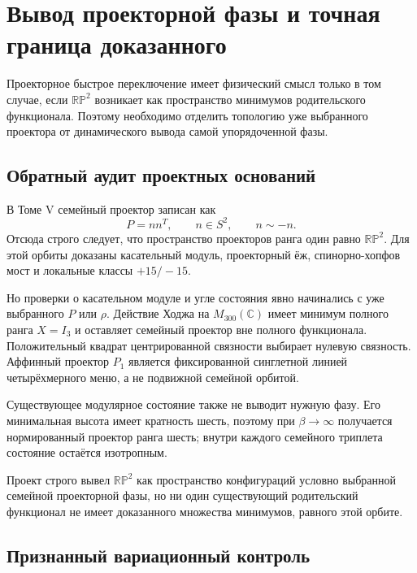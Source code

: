 \chapter{Вывод проекторной фазы и точная граница доказанного}

Проекторное быстрое переключение имеет физический смысл только в том случае, если
$\mathbb{RP}^2$ возникает как пространство минимумов родительского
функционала. Поэтому необходимо отделить топологию уже выбранного
проектора от динамического вывода самой упорядоченной фазы.

\section{Обратный аудит проектных оснований}

В Томе V семейный проектор записан как
\begin{equation}
 P=nn^T,\qquad n\in S^2,\qquad n\sim-n.
 \label{eq:v6-rp2-orbit}
\end{equation}
Отсюда строго следует, что пространство проекторов ранга один равно
$\mathbb{RP}^2$. Для этой орбиты доказаны касательный модуль, проекторный
ёж, спинорно-хопфов мост и локальные классы $+15/-15$.

Но проверки о касательном модуле и угле состояния явно начинались с уже
выбранного $P$ или $\rho$. Действие Ходжа на $M_{300}(\mathbb C)$ имеет
минимум полного ранга $X=I_3$ и оставляет семейный проектор вне полного
функционала. Положительный квадрат центрированной связности выбирает
нулевую связность. Аффинный проектор $P_1$ является фиксированной
синглетной линией четырёхмерного меню, а не подвижной семейной орбитой.

Существующее модулярное состояние также не выводит нужную фазу. Его
минимальная высота имеет кратность шесть, поэтому при
$\beta\to\infty$ получается нормированный проектор ранга шесть; внутри
каждого семейного триплета состояние остаётся изотропным.

\begin{theorem}
Проект строго вывел $\mathbb{RP}^2$ как пространство конфигураций
условно выбранной семейной проекторной фазы, но ни один существующий
родительский функционал не имеет доказанного множества минимумов,
равного этой орбите.
\end{theorem}

\section{Признанный вариационный контроль}

